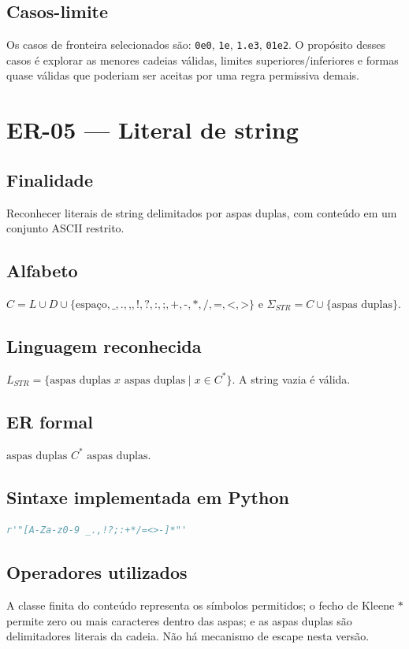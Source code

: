 \documentclass[12pt,a4paper,oneside]{report}
\begin{document}
\subsection{Casos-limite}
Os casos de fronteira selecionados são: \texttt{0e0}, \texttt{1e}, \texttt{1.e3}, \texttt{01e2}.
\medskip
O propósito desses casos é explorar as menores cadeias válidas, limites superiores/inferiores e formas quase válidas que poderiam ser aceitas por uma regra permissiva demais.

\section{ER-05 --- Literal de string}
\subsection{Finalidade}
Reconhecer literais de string delimitados por aspas duplas, com conteúdo em um conjunto ASCII restrito.
\subsection{Alfabeto}
$C=L\cup D\cup\{\text{espaço},\texttt{\_},\texttt{.},\texttt{,},\texttt{!},\texttt{?},\texttt{:},\texttt{;},\texttt{+},\texttt{-},\texttt{*},\texttt{/},\texttt{=},\texttt{<},\texttt{>}\}$ e $\Sigma_{STR}=C\cup\{\text{aspas duplas}\}$.
\subsection{Linguagem reconhecida}
$L_{STR}=\{\text{aspas duplas }x\text{ aspas duplas}\mid x\in C^*\}$. A string vazia é válida.
\subsection{ER formal}
$\text{aspas duplas }C^*\text{ aspas duplas}$.
\subsection{Sintaxe implementada em Python}
\begin{lstlisting}[language=Python]
r'"[A-Za-z0-9 _.,!?;:+*/=<>-]*"'
\end{lstlisting}
\subsection{Operadores utilizados}
A classe finita do conteúdo representa os símbolos permitidos; o fecho de Kleene $*$ permite zero ou mais caracteres dentro das aspas; e as aspas duplas são delimitadores literais da cadeia. Não há mecanismo de escape nesta versão.
\end{document}
